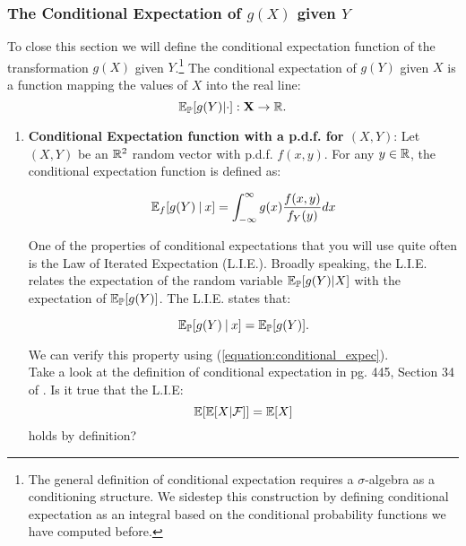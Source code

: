 \documentclass[11pt]{article} %
\begin{document}
\subsubsection{The Conditional Expectation of $g(X)$ given $Y$ }
To close this section we will define the conditional expectation function of the transformation $g(X)$ given $Y$.\footnote{The general definition of conditional expectation requires a $\sigma$-algebra as a conditioning structure. We sidestep this construction by defining conditional expectation as an integral based on the conditional probability functions we have computed before.} The conditional expectation of $g(Y)$ given $X$ is a function mapping the values of $X$ into the real line:
$$\mathbb{E}_{\mathbb{P}}[g(Y) | \cdot]: \mathbf{X} \rightarrow \mathbb{R}.$$ 

\begin{enumerate}
\item \textbf{Conditional Expectation function with a p.d.f. for $(X, Y)$}:  Let $(X,Y)$ be an $\mathbb{R}^2$ random vector with p.d.f. $f(x,y)$. For any $y \in \mathbb{R}$, the conditional expectation function is defined as: 

\begin{equation} \label{equation:conditional_expec}
\mathbb{E}_{f}[g(Y)\: | \: x ] = \int_{-\infty}^{\infty} g(x)\frac{f(x,y)}{f_{Y}(y)}dx 
\end{equation}

One of the properties of conditional expectations that you will use quite often is the Law of Iterated Expectation (L.I.E.). Broadly speaking, the L.I.E. relates the expectation of the random variable $\mathbb{E}_{\mathbb{P}}[g(Y) | X]$ with the expectation of $\mathbb{E}_{\mathbb{P}}[g(Y)]$. The L.I.E. states that:

\begin{equation}
\mathbb{E}_{\mathbb{P}}[g(Y)\: | \: x ]=\mathbb{E}_{\mathbb{P}}[g(Y)].
\end{equation}

We can verify this property using (\ref{equation:conditional_expec}).\\

 Take a look at the definition of conditional expectation in pg. 445, Section 34 of \cite{Billingsley95}. Is it true that the L.I.E:
$$\mathbb{E}[ \mathbb{E}[X | \mathcal{F}] ] = \mathbb{E}[X] $$
\noindent holds by definition? 
\end{enumerate}



\newpage




\end{document}
